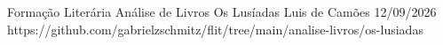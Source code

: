 \documentclass{article}
\begin{document}
\cover
    {Formação Literária} %
    {Análise de Livros}  %
    {Os Lusíadas}        %
    {Luis de Camões}     %
    {12/09/2026}         %
    {https://github.com/gabrielzschmitz/flit/tree/main/analise-livros/os-lusiadas}

% 



\newpage
\printbibliography[title=Referências]
\end{document}

